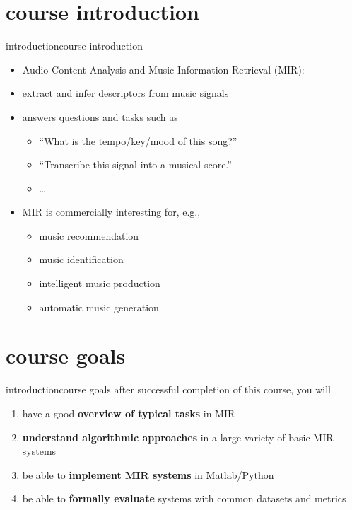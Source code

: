     \section[course intro]{course introduction}
        \begin{frame}{introduction}{course introduction}
            \begin{itemize}
                \item   Audio Content Analysis and Music Information Retrieval (MIR):
                \item   extract and infer descriptors from music signals
                \item   answers questions and tasks such as
                    \begin{itemize}
                        \item   ``What is the tempo/key/mood of this song?''
                        \item   ``Transcribe this signal into a musical score.''
                        \item   \ldots
                    \end{itemize}
                \bigskip
                \item<2->   MIR is commercially interesting for, e.g.,
                    \begin{itemize}
                        \item   music recommendation
                        \item   music identification
                        \item   intelligent music production
                        \item   automatic music generation
                    \end{itemize}
            \end{itemize}
        \end{frame}
        
    \section[course goals]{course goals}
        \begin{frame}{introduction}{course goals}
            after successful completion of this course, you will
            \smallskip
            \begin{enumerate}
                \item   have a good \textbf{overview of typical tasks} in MIR
                \item   \textbf{understand algorithmic approaches} in a large variety of basic MIR systems
                \item   be able to \textbf{implement MIR systems} in Matlab/Python
                \item   be able to \textbf{formally evaluate} systems with common datasets and metrics
            \end{enumerate}
        \end{frame}
        
